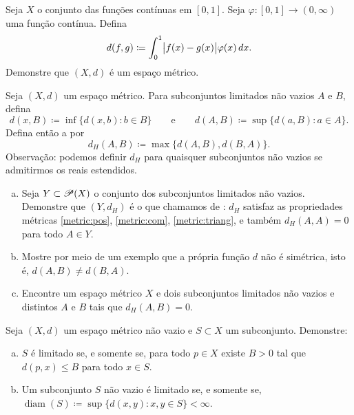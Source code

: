 \begin{exercise}
Seja $X$ o conjunto das funções contínuas em $[0,1]$. Seja $\varphi \colon
[0,1] \to (0,\infty)$ uma função contínua. Defina
\begin{equation*}
d(f,g) \coloneqq \int_0^1 \bigl\lvert {f(x)-g(x)} \bigr\rvert\varphi(x)\,dx .
\end{equation*}
Demonstre que $(X,d)$ é um espaço métrico.
\end{exercise}

\begin{exercise} \label{exercise:mshausdorffpseudo}
Seja $(X,d)$ um espaço métrico. Para subconjuntos limitados não vazios $A$ e
$B$, defina
\begin{equation*}
d(x,B) \coloneqq \inf \bigl\{ d(x,b) : b \in B \bigr\}
\qquad \text{e} \qquad
d(A,B) \coloneqq \sup \bigl\{ d(a,B) : a \in A \bigr\} .
\end{equation*}
Defina então a \emph{} por
\begin{equation*}
d_H(A,B) \coloneqq \max \bigl\{ d(A,B) , d(B,A) \bigr\} .
\end{equation*}
Observação: podemos definir $d_H$ para quaisquer subconjuntos não vazios se
admitirmos os reais estendidos.
\begin{enumerate}[a)]
\item
Seja $Y \subset {\mathscr{P}}(X)$ o conjunto dos subconjuntos limitados não vazios.
Demonstre que $(Y,d_H)$ é o que chamamos de
\emph{}: $d_H$ satisfaz as propriedades métricas
\ref{metric:pos},
\ref{metric:com}, 
\ref{metric:triang}, e também
$d_H(A,A) = 0$ para todo $A \in Y$.
\item
Mostre por meio de um exemplo que a própria função $d$ não é simétrica, isto
é, $d(A,B) \neq d(B,A)$.
\item
Encontre um espaço métrico $X$ e dois subconjuntos limitados não vazios e
distintos $A$ e $B$ tais que $d_H(A,B) = 0$.
\end{enumerate}
\end{exercise}

\begin{exercise}
Seja $(X,d)$ um espaço métrico não vazio e $S \subset X$ um subconjunto.
Demonstre:
\begin{enumerate}[a)]
\item
$S$ é limitado se, e somente se, para todo $p \in X$ existe $B > 0$ tal que
$d(p,x) \leq B$ para todo $x \in S$.
\item
Um subconjunto $S$ não vazio é limitado se, e somente se,
$\operatorname{diam}(S) \coloneqq \sup \{ d(x,y) : x,y \in S \} < \infty$.
\end{enumerate}
\end{exercise}

